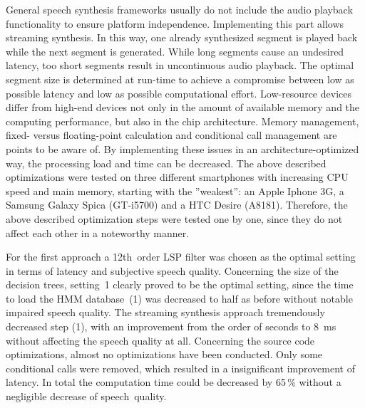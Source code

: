 \begin{table}[h]
	\caption{Test settings of optimization approach B)~\cite{toth:optimizing}}
	\vspace{-0.75em}
	\label{tab:settings}
\end{table}

General speech synthesis frameworks usually do not include the audio playback functionality to ensure platform independence. Implementing this part allows streaming synthesis. In this way, one already synthesized segment is played back while the next segment is generated. While long segments cause an undesired latency, too short segments result in uncontinuous audio playback. The optimal segment size is determined at run-time to achieve a compromise between low as possible latency and low as possible \break computational effort. Low-resource devices differ from high-end devices not only in the amount of available memory and the computing performance, but also in the chip architecture. Memory management, fixed- versus floating-point calculation and conditional call management are points to be aware of. By implementing these issues in an architecture-optimized way, the processing load and time can be decreased. The above described optimizations were tested on three different smartphones with increasing CPU speed and main memory, starting with the ''weakest'': an Apple Iphone 3G, a Samsung Galaxy Spica (GT-i5700) and a HTC Desire (A8181). Therefore, the above described optimization steps were tested one by one, since they do not affect each other in a noteworthy manner.

For the first approach a 12th~order \ac{LSP} filter was chosen as the optimal setting in terms of latency and subjective speech quality. Concerning the size of the decision trees, setting~1 clearly proved to be the optimal setting, since the time to load the \ac{HMM} database~(1) was decreased to half as before without notable impaired speech quality. The streaming synthesis approach tremendously decreased step (1), with an improvement from the order of seconds to 8~ms without affecting the speech quality at all. Concerning the source code optimizations, almost no optimizations have been conducted. Only some conditional calls were removed, which resulted in a insignificant improvement of latency. In total the computation time could be decreased by 65\,\% without a negligible decrease of speech~quality.

